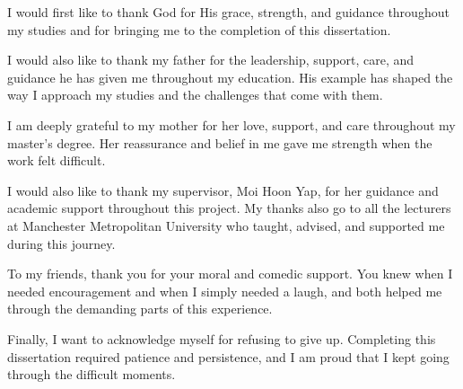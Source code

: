 I would first like to thank God for His grace, strength, and guidance throughout my studies and for bringing me to the completion of this dissertation.

I would also like to thank my father for the leadership, support, care, and guidance he has given me throughout my education. His example has shaped the way I approach my studies and the challenges that come with them.

I am deeply grateful to my mother for her love, support, and care throughout my master's degree. Her reassurance and belief in me gave me strength when the work felt difficult.

I would also like to thank my supervisor, Moi Hoon Yap, for her guidance and academic support throughout this project. My thanks also go to all the lecturers at Manchester Metropolitan University who taught, advised, and supported me during this journey.

To my friends, thank you for your moral and comedic support. You knew when I needed encouragement and when I simply needed a laugh, and both helped me through the demanding parts of this experience.

Finally, I want to acknowledge myself for refusing to give up. Completing this dissertation required patience and persistence, and I am proud that I kept going through the difficult moments.
